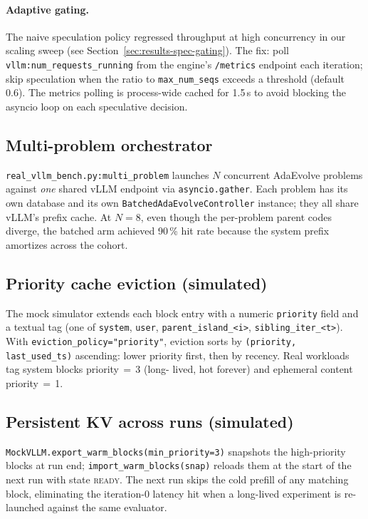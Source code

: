 \documentclass[11pt]{article}
\newcommand{\adaev}{AdaEvolve}
\newcommand{\bcontroller}{\texttt{BatchedAdaEvolveController}}
\begin{document}
\paragraph{Adaptive gating.}
The naive speculation policy regressed throughput at high
concurrency in our scaling sweep (see Section~\ref{sec:results-spec-gating}).
The fix: poll \verb|vllm:num_requests_running| from the engine's
\texttt{/metrics} endpoint each iteration; skip speculation when the
ratio to \verb|max_num_seqs| exceeds a threshold (default 0.6). The
metrics polling is process-wide cached for 1.5\,s to avoid blocking
the asyncio loop on each speculative decision.

\subsection{Multi-problem orchestrator}
\label{sec:approach-orch}

\verb|real_vllm_bench.py:multi_problem| launches $N$ concurrent
\adaev{} problems against \emph{one} shared vLLM endpoint via
\verb|asyncio.gather|. Each problem has its own database and its own
\bcontroller{} instance; they all share vLLM's prefix cache. At
$N{=}8$, even though the per-problem parent codes diverge, the
batched arm achieved 90\,\% hit rate because the system prefix
amortizes across the cohort.

\subsection{Priority cache eviction (simulated)}
\label{sec:approach-priority}

The mock simulator extends each block entry with a numeric
\verb|priority| field and a textual tag (one of \verb|system|,
\verb|user|, \verb|parent_island_<i>|, \verb|sibling_iter_<t>|).
With \verb|eviction_policy="priority"|, eviction sorts by
\verb|(priority, last_used_ts)| ascending: lower priority first, then
by recency. Real workloads tag system blocks priority\,$=$\,3 (long-
lived, hot forever) and ephemeral content priority\,$=$\,1.

\subsection{Persistent KV across runs (simulated)}

\verb|MockVLLM.export_warm_blocks(min_priority=3)| snapshots the
high-priority blocks at run end; \verb|import_warm_blocks(snap)|
reloads them at the start of the next run with state \textsc{ready}.
The next run skips the cold prefill of any matching block, eliminating
the iteration-0 latency hit when a long-lived experiment is
re-launched against the same evaluator.
\end{document}
